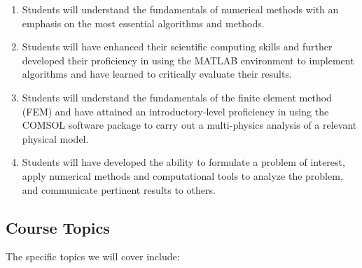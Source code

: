 \begin{enumerate}
\item Students will understand the fundamentals of numerical methods with an emphasis on the most essential algorithms and methods.

\item Students will have enhanced their scientific computing skills and further developed their proficiency in using the MATLAB environment to implement algorithms and have learned to critically evaluate their results.

\item Students will understand the fundamentals of the finite element method (FEM) and have attained an introductory-level proficiency in using the COMSOL software package to carry out a multi-physics analysis of a relevant physical model.

\item Students will have developed the ability to formulate a problem of interest, apply numerical methods and computational tools to analyze the problem, and communicate pertinent results to others.
\end{enumerate}


\subsection{Course Topics}
The specific topics we will cover include:

